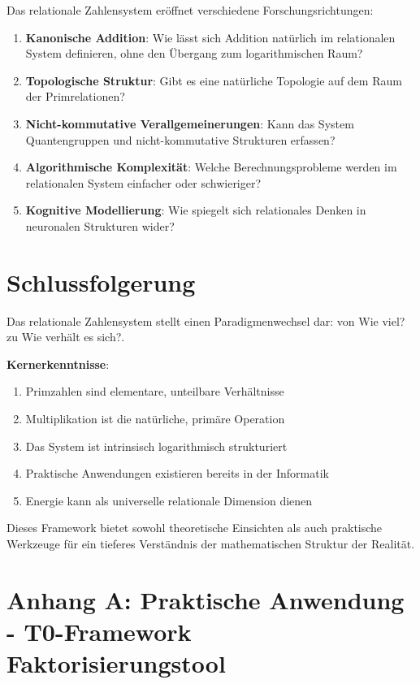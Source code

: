 \documentclass[11pt,a4paper]{article}
\begin{document}
	Das relationale Zahlensystem eröffnet verschiedene Forschungsrichtungen:
	
	\begin{enumerate}
		\item \textbf{Kanonische Addition}: Wie lässt sich Addition natürlich im relationalen System definieren, ohne den Übergang zum logarithmischen Raum?
		\item \textbf{Topologische Struktur}: Gibt es eine natürliche Topologie auf dem Raum der Primrelationen?
		\item \textbf{Nicht-kommutative Verallgemeinerungen}: Kann das System Quantengruppen und nicht-kommutative Strukturen erfassen?
		\item \textbf{Algorithmische Komplexität}: Welche Berechnungsprobleme werden im relationalen System einfacher oder schwieriger?
		\item \textbf{Kognitive Modellierung}: Wie spiegelt sich relationales Denken in neuronalen Strukturen wider?
	\end{enumerate}
	
	\section{Schlussfolgerung}
	
	Das relationale Zahlensystem stellt einen Paradigmenwechsel dar: von Wie viel? zu Wie verhält es sich?. 
	
	\textbf{Kernerkenntnisse}:
	\begin{enumerate}
		\item Primzahlen sind elementare, unteilbare Verhältnisse
		\item Multiplikation ist die natürliche, primäre Operation
		\item Das System ist intrinsisch logarithmisch strukturiert
		\item Praktische Anwendungen existieren bereits in der Informatik
		\item Energie kann als universelle relationale Dimension dienen
	\end{enumerate}
	
	Dieses Framework bietet sowohl theoretische Einsichten als auch praktische Werkzeuge für ein tieferes Verständnis der mathematischen Struktur der Realität.
	
	\section{Anhang A: Praktische Anwendung - T0-Framework Faktorisierungstool}
	
\end{document}
